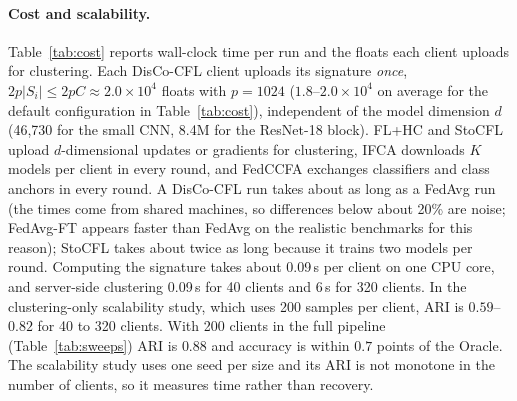 \paragraph{Cost and scalability.}\label{sec:cost}
Table~\ref{tab:cost} reports wall-clock time per run and the floats each client uploads for clustering. Each DisCo-CFL client uploads its signature \emph{once}, $2p|S_i|\le2pC\approx2.0\times10^4$ floats with $p=1024$ ($1.8$--$2.0\times10^4$ on average for the default configuration in Table~\ref{tab:cost}), independent of the model dimension $d$ (46{,}730 for the small CNN, 8.4M for the ResNet-18 block). FL+HC and StoCFL upload $d$-dimensional updates or gradients for clustering, IFCA downloads $K$ models per client in every round, and FedCCFA exchanges classifiers and class anchors in every round. A DisCo-CFL run takes about as long as a FedAvg run (the times come from shared machines, so differences below about 20\% are noise; FedAvg-FT appears faster than FedAvg on the realistic benchmarks for this reason); StoCFL takes about twice as long because it trains two models per round. Computing the signature takes about 0.09\,s per client on one CPU core, and server-side clustering 0.09\,s for 40 clients and 6\,s for 320 clients. In the clustering-only scalability study, which uses 200 samples per client, ARI is $0.59$--$0.82$ for 40 to 320 clients. With 200 clients in the full pipeline (Table~\ref{tab:sweeps}) ARI is $0.88$ and accuracy is within $0.7$ points of the Oracle. The scalability study uses one seed per size and its ARI is not monotone in the number of clients, so it measures time rather than recovery.

\begin{table}[!htbp]
\centering
\caption{Cost per run: mean wall-clock time (minutes; one CPU core for the small CNN, one GPU for the realistic benchmarks) and floats uploaded per client for the clustering signal. DisCo-AS: label-free warm-up (Section~\ref{sec:warmup}); DisCo-full: signature from the gradient of the whole layer-4 block (realistic benchmarks); DisCo-linkorder, DisCo-mean, DisCo-noClass, DisCo-noClip and DisCo-noDisatt: the ablation variants of Table~\ref{tab:abl} (linkage-ordered merging, mean linkage, without class conditioning, without clipping, without disattenuation).}\label{tab:cost}

\end{table}

